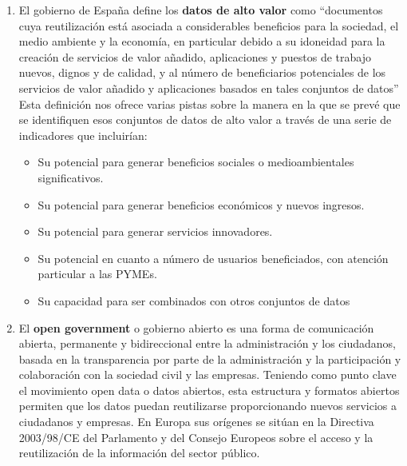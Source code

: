 \begin{enumerate}
	\item El gobierno de España define los \textbf{datos de alto valor} \label{def1}  como “documentos cuya reutilización está asociada a considerables beneficios para la sociedad, el medio ambiente y la economía, en particular debido a su idoneidad para la creación de servicios de valor añadido, aplicaciones y puestos de trabajo nuevos, dignos y de calidad, y al número de beneficiarios potenciales de los servicios de valor añadido y aplicaciones basados en tales conjuntos de datos” Esta definición nos ofrece varias pistas sobre la manera en la que se prevé que se identifiquen esos conjuntos de datos de alto valor a través de una serie de indicadores que incluirían:
		\begin{itemize}
			\item Su potencial para generar beneficios sociales o medioambientales significativos.
			
			\item Su potencial para generar beneficios económicos y nuevos ingresos.
			
			\item Su potencial para generar servicios innovadores.
			
			\item Su potencial en cuanto a número de usuarios beneficiados, con atención particular a las PYMEs.
			
			\item Su capacidad para ser combinados con otros conjuntos de datos
		\end{itemize}
		
	\item El \textbf{open government} \label{def2} o gobierno abierto es una forma de comunicación abierta, permanente y bidireccional entre la administración y los ciudadanos, basada en la transparencia por parte de la administración y la participación y colaboración con la sociedad civil y las empresas. Teniendo como punto clave el movimiento open data o datos abiertos, esta estructura y formatos abiertos permiten que los datos puedan reutilizarse proporcionando nuevos servicios a ciudadanos y empresas. En Europa sus orígenes se sitúan en la Directiva 2003/98/CE del Parlamento y del Consejo Europeos sobre el acceso y la reutilización de la información del sector público. \citep{OperGovernment2011}
	

\end{enumerate}
